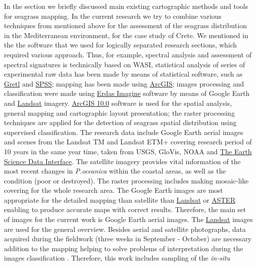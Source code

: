 \documentclass[11pt]{article}
\begin{document}
In the section  we briefly discussed main existing cartographic methods and tools for seagrass mapping. In the current  research we try to combine various techniques from mentioned above for the assessment of the seagrass distribution in the Mediterranean environment, for the case study of Crete. We mentioned in the  the software that we used for logically separated research sections, which required various approach. Thus, for example,  spectral analysis and assessment of spectral signatures is technically based on \ac{WASI}, statistical analysis of series of experimental raw data has been made by means of statistical software, such as \href{http://gretl.sourceforge.net/}{Gretl} and \href{http://www.spss.com/}{SPSS}; mapping has been made using  \href{http://www.esri.com/software/arcgis/index.html}{ArcGIS}; images processing and classification were made using \href{http://www.erdas.com/products/ERDASIMAGINE/ERDASIMAGINE/Details.aspx}{Erdas Imagine} software by means of Google Earth and  \href{http://landsat.gsfc.nasa.gov/}{Landsat} imagery.
\href{http://www.esri.com/software/arcgis/index.html}{ArcGIS 10.0} software is used for the spatial analysis, general mapping and cartographic layout
presentation; the raster processing techniques are applied for the detection of seagrass spatial
distribution using supervised classification.
The research data include Google Earth aerial images and scenes from the \ac{Landsat TM} and \ac{Landsat ETM+}
covering research period of 10 years in the same year time, taken from \ac{USGS}, \ac{GloVis}, \ac{NOAA} and \href{http://glcfapp.glcf.umd.edu:8080/esdi/index.jsp}{The Earth Science Data Interface}. 
The satellite imagery provides
vital information of the most recent changes in \textit{P.oceanica} within the coastal areas, as well as the
condition (poor or destroyed).
The raster processing includes making mosaic-like covering for the whole research area. The Google
Earth images are most appropriate for the detailed mapping than satellite than \href{http://landsat.gsfc.nasa.gov/}{Landsat} or \href{http://asterweb.jpl.nasa.gov/}{ASTER} enabling to produce accurate maps with correct results. Therefore, the main set of images for the
current work is Google Earth aerial images. The  \href{http://landsat.gsfc.nasa.gov/}{Landsat} images are used for the general overview.
Besides aerial and satellite photographs, data acquired during the fieldwork (three weeks in September - October) are
necessary addition to the mapping helping to solve problems of interpretation during the images
classification \cite{Pasqualini98a}\label{Pasqualini98a}. Therefore, this work includes sampling of the \textit{in-situ}
\end{document}
